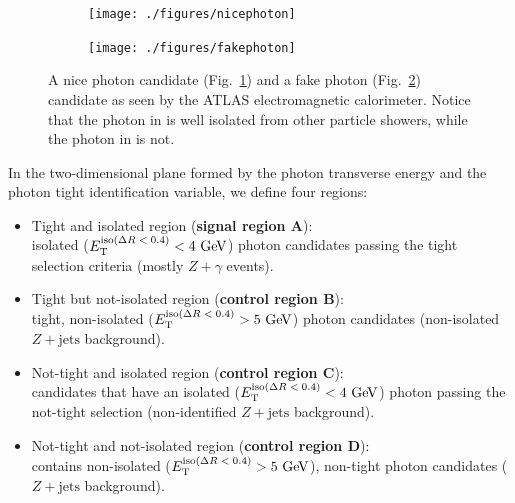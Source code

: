 \begin{figure}[htbp]
   \centering 

    \begin{subfigure}[b]{0.45\textwidth}
        \centering
        \texttt{[image: ./figures/nicephoton]}
        \caption{}
        \label{fig:nicephoton}
    \end{subfigure}
    \quad 
    \begin{subfigure}[b]{0.45\textwidth}
        \centering
        \texttt{[image: ./figures/fakephoton]}
        \caption{}
        \label{fig:fakephoton}
    \end{subfigure}
    \caption{A nice photon candidate (Fig.~\ref{fig:nicephoton}) and a fake photon 
    (Fig.~\ref{fig:fakephoton}) candidate as seen by the ATLAS electromagnetic
    calorimeter. Notice that the photon in  is well isolated
    from other particle showers, while the photon in  is not.}
    \label{fig:photonshowers}
\end{figure}

In the two-dimensional plane formed by the photon transverse energy and
the photon tight identification variable, we define four regions:
\begin{itemize}
 \item Tight and isolated region (\textbf{signal region A}):\\
 isolated ($\et^{\text{iso($\Delta R < 0.4$)}} < 4 \GeV$) photon candidates 
 passing the tight selection criteria (mostly $Z+\gamma$ events). 
%
 \item Tight but not-isolated region (\textbf{control region B}):\\
 tight, non-isolated ($\et^{\text{iso($\Delta R < 0.4$)}} > 5 \GeV$) 
 photon candidates (non-isolated $Z+\text{jets}$ background).
%
 \item Not-tight and isolated region (\textbf{control region C}): \\
 candidates that have an isolated ($\et^{\text{iso($\Delta R < 0.4$)}} < 4 \GeV$)
 photon passing the not-tight selection (non-identified $Z+\text{jets}$ background). 
%
 \item Not-tight and not-isolated region (\textbf{control region D}): \\
 contains non-isolated ($\et^{\text{iso($\Delta R < 0.4$)}} > 5 \GeV$), 
 non-tight photon candidates ($Z+\text{jets}$ background).
\end{itemize}

